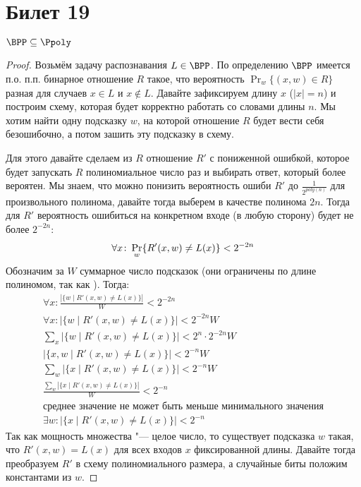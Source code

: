 \setcounter{section}{18}
\section{Билет 19}
	\begin{theorem}
		$\BPP \subseteq \Ppoly$
	\end{theorem}
	\begin{proof}
		Возьмём задачу распознавания $L \in \BPP$.
		По определению $\BPP$ имеется п.о. п.п. бинарное отношение $R$ такое, что вероятность $\Pr_w \{ (x, w) \in R \}$ разная для случаев
		$x \in L$ и $x \notin L$.
		Давайте зафиксируем длину $x$ ($|x|=n$) и построим схему, которая будет корректно работать со словами длины $n$.
		Мы хотим найти одну подсказку $w$, на которой отношение $R$ будет вести себя безошибочно, а потом зашить эту подсказку в схему.

		Для этого давайте сделаем из $R$ отношение $R'$ с пониженной ошибкой, которое будет запускать $R$ полиномиальное число раз и выбирать ответ, который более вероятен.
		Мы знаем, что можно понизить вероятность ошиби $R'$ до $\frac{1}{2^{poly(n)}}$ для произвольного полинома, давайте тогда выберем в качестве полинома $2n$.
		Тогда для $R'$ вероятность ошибиться на конкретном входе (в любую сторону) будет не более $2^{-2n}$:
		\[
			\forall x \colon \Pr_w\{ R'(x, w) \neq L(x) \} < 2^{-2n} \\
		\]
		Обозначим за $W$ суммарное число подсказок (они ограничены по длине полиномом, так как \TODO).
		Тогда:
		\begin{gather*}
			\forall x \colon \frac{|\{ w \mid R'(x, w) \neq L(x) \}|}{W} < 2^{-2n} \\
			\forall x \colon |\{ w \mid R'(x, w) \neq L(x) \}| < 2^{-2n}W \\
			\sum_x |\{ w \mid R'(x, w) \neq L(x) \}| < 2^n \cdot 2^{-2n}W \\
			|\{ x, w \mid R'(x, w) \neq L(x) \}| < 2^{-n}W \\
			\sum_w |\{ x \mid R'(x, w) \neq L(x) \}| < 2^{-n}W \\
			\frac{\sum_w |\{ x \mid R'(x, w) \neq L(x) \}|}{W} < 2^{-n} \\
			\text{среднее значение не может быть меньше минимального значения} \\
			\exists w \colon |\{x \mid R'(x, w) \neq L(x)\}| < 2^{-n}
		\end{gather*}
		Так как мощность множества "--- целое число, то существует подсказка $w$ такая, что $R'(x, w)=L(x)$ для всех входов $x$ фиксированной длины.
		Давайте тогда преобразуем $R'$ в схему полиномиального размера, а случайные биты положим константами из $w$.
	\end{proof}
